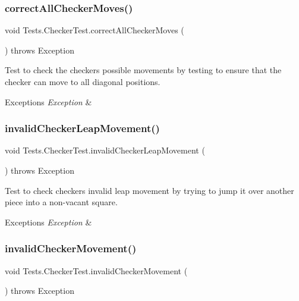 \subsubsection{\texorpdfstring{correct\+All\+Checker\+Moves()}{correctAllCheckerMoves()}}
{\footnotesize\ttfamily void Tests.\+Checker\+Test.\+correct\+All\+Checker\+Moves (\begin{DoxyParamCaption}{ }\end{DoxyParamCaption}) throws Exception}

Test to check the checker\textquotesingle{}s possible movements by testing to ensure that the checker can move to all diagonal positions. 
\begin{DoxyExceptions}{Exceptions}
{\em Exception} & \\
\hline
\end{DoxyExceptions}
\hypertarget{class_tests_1_1_checker_test_abff00b6e6dc767071f07e864a4636a63}{}\label{class_tests_1_1_checker_test_abff00b6e6dc767071f07e864a4636a63} 
\subsubsection{\texorpdfstring{invalid\+Checker\+Leap\+Movement()}{invalidCheckerLeapMovement()}}
{\footnotesize\ttfamily void Tests.\+Checker\+Test.\+invalid\+Checker\+Leap\+Movement (\begin{DoxyParamCaption}{ }\end{DoxyParamCaption}) throws Exception}

Test to check checker\textquotesingle{}s invalid leap movement by trying to jump it over another piece into a non-\/vacant square. 
\begin{DoxyExceptions}{Exceptions}
{\em Exception} & \\
\hline
\end{DoxyExceptions}
\hypertarget{class_tests_1_1_checker_test_ac9d201b3122764534da6751a881509ee}{}\label{class_tests_1_1_checker_test_ac9d201b3122764534da6751a881509ee} 
\subsubsection{\texorpdfstring{invalid\+Checker\+Movement()}{invalidCheckerMovement()}}
{\footnotesize\ttfamily void Tests.\+Checker\+Test.\+invalid\+Checker\+Movement (\begin{DoxyParamCaption}{ }\end{DoxyParamCaption}) throws Exception}

